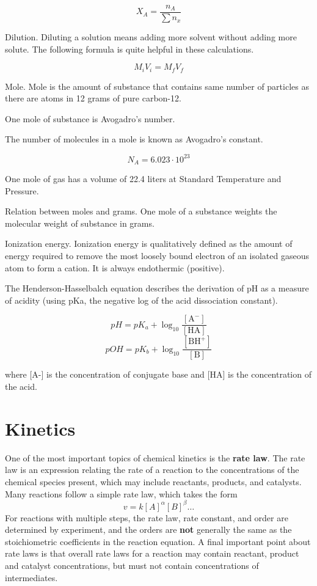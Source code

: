 \documentclass{book}
\begin{document}
\[X_A = \frac{n_A}{\sum{n_x}}\]

Dilution. Diluting a solution means adding more solvent without adding more solute.
The following formula is quite helpful in these calculations.

\[M_i V_i = M_f V_f\]

Mole. Mole is the amount of substance that contains same number of particles as
there are atoms in 12 grams of pure carbon-12.

One mole of substance is Avogadro's number.

The number of molecules in a mole is known as Avogadro's constant.

\[N_A = 6.023 \cdot 10^{23}\]

One mole of gas has a volume of 22.4 liters at Standard Temperature and Pressure.

Relation between moles and grams.
One mole of a substance weights the molecular weight of substance in grams.

Ionization energy. Ionization energy is qualitatively defined as the amount of
energy required to remove the most loosely bound electron of an isolated
gaseous atom to form a cation. It is always endothermic (positive).

The Henderson-Hasselbalch equation describes the derivation of pH as a
measure of acidity (using pKa, the negative log of the acid dissociation
constant).

\[pH = pK_a + \log_{10} \frac{[\text{A}^-]}{[\text{HA}]}\]
\[pOH = pK_b + \log_{10} \frac{[\text{BH}^+]}{[\text{B}]}\]

where [A-] is the concentration of conjugate base and [HA] is the concentration
of the acid.

\section{Kinetics}

One of the most important topics of chemical kinetics is the \textbf{rate law}.
The rate law is an expression relating the rate of a reaction to the concentrations of the chemical
species present, which may include reactants, products, and catalysts. Many reactions follow a
simple rate law, which takes the form
\[v = k [A]^\alpha [B]^\beta \ldots\]
For reactions with multiple steps, the rate law, rate constant, and order are determined by experiment,
and the orders are \textbf{not} generally the same as the stoichiometric coefficients in the reaction equation.
A final important point about rate laws is that overall rate laws for a reaction may contain reactant,
product and catalyst concentrations, but must not contain concentrations of intermediates.
\end{document}
